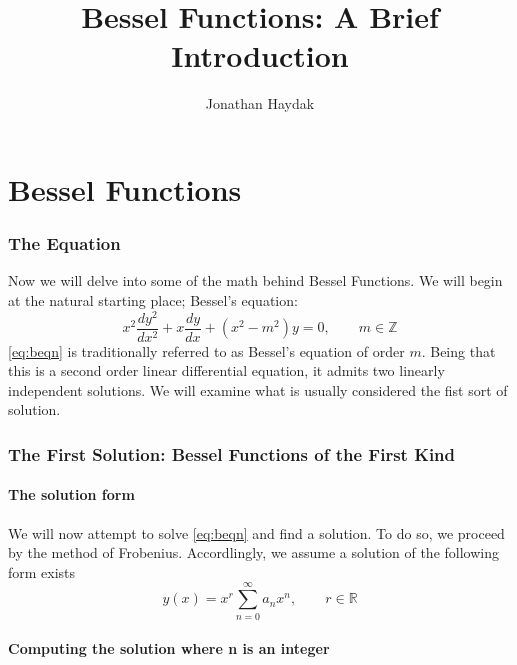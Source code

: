\documentclass[]{article}
\title{Bessel Functions: A Brief Introduction}
\author{Jonathan Haydak}
\begin{document}
\maketitle
\tableofcontents
\newcommand{\der}[1]{\frac{\partial}{\partial {#1}}}
\part{Bessel Functions}

\section{The Equation}
\begin{flushleft}
Now we will delve into some of the math behind Bessel Functions. We will begin at the natural starting place; Bessel's equation:
\begin{equation} \label{eq:beqn}
 x^2\frac{dy^2}{dx^2} + x \frac{dy}{dx} + (x^2-m^2)y = 0, \qquad m \in \mathbb{Z} 
\end{equation}
\eqref{eq:beqn} is traditionally referred to as Bessel's equation of order $m$. Being that this is a second order linear differential equation, it admits two linearly independent solutions. We will examine what is usually considered the fist sort of solution.
\end{flushleft}
\section{The First Solution: Bessel Functions of the First Kind}
\subsection{The solution form}
We will now attempt to solve \eqref{eq:beqn} and find a solution. To do so, we proceed by the method of Frobenius. Accordlingly, we assume a solution of the following form exists
\begin{equation} \label{eq:s1}
y(x) = x^r \sum_{n = 0}^{\infty} a_nx^n, \qquad r \in \mathbb{R}
\end{equation}
\subsection{Computing the solution where n is an integer}
\end{document}
